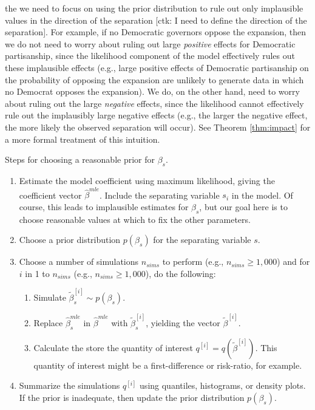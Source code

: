 \documentclass[12pt]{article}
\begin{document}
 the we need to focus on using the prior distribution to rule out only implausible values in the direction of the separation [ctk: I need to define the direction of the separation]. For example, if no Democratic governors oppose the expansion, then we do not need to worry about ruling out large \textit{positive} effects for Democratic partisanship, since the likelihood component of the model effectively rules out these implausible effects (e.g., large positive effects of Democratic partisanship on the probability of opposing the expansion are unlikely to generate data in which no Democrat opposes the expansion). We do, on the other hand, need to worry about ruling out the large \textit{negative} effects, since the likelihood cannot effectively rule out the implausibly large negative effects (e.g., the larger the negative effect, the more likely the observed separation will occur). See Theorem \ref{thm:impact} for a more formal treatment of this intuition.

Steps for choosing a reasonable prior for $\beta_s$.
\begin{enumerate}
\item Estimate the model coefficient using maximum likelihood, giving the coefficient vector $\hat{\beta}^{mle}$. Include the separating variable $s_i$ in the model. Of course, this leads to implausible estimates for $\beta_s$, but our goal here is to choose reasonable values at which to fix the other parameters. 
\item Choose a prior distribution $p(\beta_s)$ for the separating variable $s$. 
\item Choose a number of simulations $n_{sims}$ to perform (e.g., $n_{sims} \geq 1,000$) and for $i$ in 1 to $n_{sims}$ (e.g., $n_{sims} \geq 1,000$), do the following:
	\begin{enumerate}
	\item Simulate $\tilde{\beta}^{[i]}_s \sim p(\beta_s)$.
	\item Replace $\hat{\beta}_s^{mle}$ in $\hat{\beta}^{mle}$ with $\tilde{\beta}^{[i]}_s$, yielding the vector $\tilde{\beta}^{[i]}$.
	\item Calculate the store the quantity of interest $q^{[i]} = q\left(\tilde{\beta}^{[i]}\right)$. This quantity of interest might be a first-difference or risk-ratio, for example.
	\end{enumerate}
\item Summarize the simulations $q^{[i]}$ using quantiles, histograms, or density plots. If the prior is inadequate, then update the prior distribution $p(\beta_s)$.
\end{enumerate}
\end{document}
